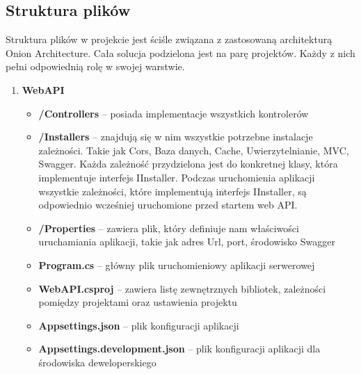 \documentclass[a4paper,twoside,12pt]{book}
\begin{document}
\subsection{Struktura plików}
Struktura plików w projekcie jest ściśle związana z zastosowaną architekturą Onion Architecture.
Cała solucja podzielona jest na parę projektów. Każdy z nich pełni odpowiednią rolę w swojej warstwie.  

\begin{enumerate}
    \item \textbf{WebAPI} \begin{itemize}
        \item \textbf{/Controllers} -- posiada implementacje wszystkich kontrolerów 
        \item \textbf{/Installers} -- znajdują się w nim wszystkie potrzebne instalacje zależności. Takie jak Cors, Baza danych, Cache, Uwierzytelnianie, MVC, Swagger. Każda zależność przydzielona jest do konkretnej klasy, która implementuje interfejs IInstaller. Podczas uruchomienia aplikacji wszystkie zależności, które implementują interfejs IInstaller, są odpowiednio wcześniej uruchomione przed startem web API. 
        \item \textbf{/Properties} -- zawiera plik, który definiuje nam właściwości uruchamiania aplikacji, takie jak adres Url, port, środowisko Swagger 
        \item \textbf{Program.cs} -- główny plik uruchomieniowy aplikacji serwerowej 
        \item \textbf{WebAPI.csproj} -- zawiera listę zewnętrznych bibliotek, zależności pomiędzy projektami oraz ustawienia projektu 
        \item \textbf{Appsettings.json} -- plik konfiguracji aplikacji 
        \item \textbf{Appsettings.development.json} -- plik konfiguracji aplikacji dla środowiska deweloperskiego 
    \end{itemize}


\end{enumerate}
\end{document}
